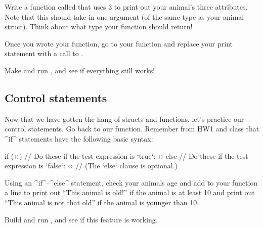 \documentclass{tufte-handout}
\begin{document}
Write a function called  that uses
3 to print out your animal's three attributes.
Note that this should take in one argument (of the same type as your
animal struct). Think about what type your function should
return!

Once you wrote your function, go to your  function
and replace your print statement with a call to
.

Make and run , and see if everything still works!

\subsection{Control statements}

Now that we have gotten the hang of structs and functions, let's
practice our control statements.  Go back to our
 function.  Remember from HW1 and class that
^if^ statements have the following basic syntax:

\begin{Code}
    if (‹›) {
        // Do these if the test expression is `true`:
        ‹›
    } else {
        // Do these if the test expression is `false`:
        ‹›
        // (The `else` clause is optional.)
    }
\end{Code}

Using an ^if^--^else^ statement, check your animals age and add to your
 function a line to print out ``This animal is
old!'' if the animal is at least 10 and print out ``This animal is not
that old'' if the animal is younger than 10.

Build and run , and see if this feature is working.
\end{document}
